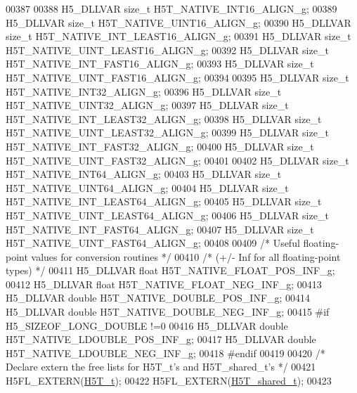 \begin{DoxyCode}
00387 
00388 H5\_DLLVAR \textcolor{keywordtype}{size\_t}    H5T\_NATIVE\_INT16\_ALIGN\_g;
00389 H5\_DLLVAR \textcolor{keywordtype}{size\_t}    H5T\_NATIVE\_UINT16\_ALIGN\_g;
00390 H5\_DLLVAR \textcolor{keywordtype}{size\_t}    H5T\_NATIVE\_INT\_LEAST16\_ALIGN\_g;
00391 H5\_DLLVAR \textcolor{keywordtype}{size\_t}    H5T\_NATIVE\_UINT\_LEAST16\_ALIGN\_g;
00392 H5\_DLLVAR \textcolor{keywordtype}{size\_t}    H5T\_NATIVE\_INT\_FAST16\_ALIGN\_g;
00393 H5\_DLLVAR \textcolor{keywordtype}{size\_t}    H5T\_NATIVE\_UINT\_FAST16\_ALIGN\_g;
00394 
00395 H5\_DLLVAR \textcolor{keywordtype}{size\_t}    H5T\_NATIVE\_INT32\_ALIGN\_g;
00396 H5\_DLLVAR \textcolor{keywordtype}{size\_t}    H5T\_NATIVE\_UINT32\_ALIGN\_g;
00397 H5\_DLLVAR \textcolor{keywordtype}{size\_t}    H5T\_NATIVE\_INT\_LEAST32\_ALIGN\_g;
00398 H5\_DLLVAR \textcolor{keywordtype}{size\_t}    H5T\_NATIVE\_UINT\_LEAST32\_ALIGN\_g;
00399 H5\_DLLVAR \textcolor{keywordtype}{size\_t}    H5T\_NATIVE\_INT\_FAST32\_ALIGN\_g;
00400 H5\_DLLVAR \textcolor{keywordtype}{size\_t}    H5T\_NATIVE\_UINT\_FAST32\_ALIGN\_g;
00401 
00402 H5\_DLLVAR \textcolor{keywordtype}{size\_t}    H5T\_NATIVE\_INT64\_ALIGN\_g;
00403 H5\_DLLVAR \textcolor{keywordtype}{size\_t}    H5T\_NATIVE\_UINT64\_ALIGN\_g;
00404 H5\_DLLVAR \textcolor{keywordtype}{size\_t}    H5T\_NATIVE\_INT\_LEAST64\_ALIGN\_g;
00405 H5\_DLLVAR \textcolor{keywordtype}{size\_t}    H5T\_NATIVE\_UINT\_LEAST64\_ALIGN\_g;
00406 H5\_DLLVAR \textcolor{keywordtype}{size\_t}    H5T\_NATIVE\_INT\_FAST64\_ALIGN\_g;
00407 H5\_DLLVAR \textcolor{keywordtype}{size\_t}    H5T\_NATIVE\_UINT\_FAST64\_ALIGN\_g;
00408 
00409 \textcolor{comment}{/* Useful floating-point values for conversion routines */}
00410 \textcolor{comment}{/* (+/- Inf for all floating-point types) */}
00411 H5\_DLLVAR \textcolor{keywordtype}{float} H5T\_NATIVE\_FLOAT\_POS\_INF\_g;
00412 H5\_DLLVAR \textcolor{keywordtype}{float} H5T\_NATIVE\_FLOAT\_NEG\_INF\_g;
00413 H5\_DLLVAR \textcolor{keywordtype}{double} H5T\_NATIVE\_DOUBLE\_POS\_INF\_g;
00414 H5\_DLLVAR \textcolor{keywordtype}{double} H5T\_NATIVE\_DOUBLE\_NEG\_INF\_g;
00415 \textcolor{preprocessor}{#if H5\_SIZEOF\_LONG\_DOUBLE !=0}
00416 H5\_DLLVAR \textcolor{keywordtype}{double} H5T\_NATIVE\_LDOUBLE\_POS\_INF\_g;
00417 H5\_DLLVAR \textcolor{keywordtype}{double} H5T\_NATIVE\_LDOUBLE\_NEG\_INF\_g;
00418 \textcolor{preprocessor}{#endif}
00419 
00420 \textcolor{comment}{/* Declare extern the free lists for H5T\_t's and H5T\_shared\_t's */}
00421 H5FL\_EXTERN(\hyperlink{struct_h5_t__t}{H5T\_t});
00422 H5FL\_EXTERN(\hyperlink{struct_h5_t__shared__t}{H5T\_shared\_t});
00423 

\end{DoxyCode}
